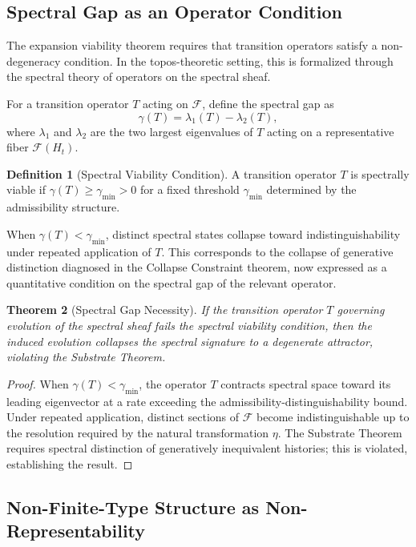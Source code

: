 \documentclass[12pt, a4paper]{article}
\theoremstyle{plain}
\newtheorem{theorem}{Theorem}[section]
\theoremstyle{definition}
\newtheorem{definition}[theorem]{Definition}
\theoremstyle{remark}
\begin{document}
\subsection{Spectral Gap as an Operator Condition}

The expansion viability theorem requires that transition operators satisfy a non-degeneracy condition. In the topos-theoretic setting, this is formalized through the spectral theory of operators on the spectral sheaf.

For a transition operator $T$ acting on $\mathcal{F}$, define the spectral gap as
\[
\gamma(T) = \lambda_1(T) - \lambda_2(T),
\]
where $\lambda_1$ and $\lambda_2$ are the two largest eigenvalues of $T$ acting on a representative fiber $\mathcal{F}(H_t)$.

\begin{definition}[Spectral Viability Condition]
A transition operator $T$ is spectrally viable if $\gamma(T) \geq \gamma_{\min} > 0$ for a fixed threshold $\gamma_{\min}$ determined by the admissibility structure.
\end{definition}

When $\gamma(T) < \gamma_{\min}$, distinct spectral states collapse toward indistinguishability under repeated application of $T$. This corresponds to the collapse of generative distinction diagnosed in the Collapse Constraint theorem, now expressed as a quantitative condition on the spectral gap of the relevant operator.

\begin{theorem}[Spectral Gap Necessity]
If the transition operator $T$ governing evolution of the spectral sheaf fails the spectral viability condition, then the induced evolution collapses the spectral signature to a degenerate attractor, violating the Substrate Theorem.
\end{theorem}

\begin{proof}
When $\gamma(T) < \gamma_{\min}$, the operator $T$ contracts spectral space toward its leading eigenvector at a rate exceeding the admissibility-distinguishability bound. Under repeated application, distinct sections of $\mathcal{F}$ become indistinguishable up to the resolution required by the natural transformation $\eta$. The Substrate Theorem requires spectral distinction of generatively inequivalent histories; this is violated, establishing the result.
\end{proof}

\subsection{Non-Finite-Type Structure as Non-Representability}
\end{document}
